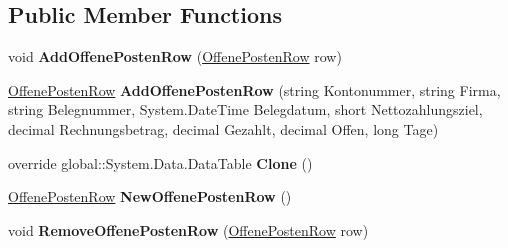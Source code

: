 \subsection*{Public Member Functions}
\begin{DoxyCompactItemize}
\item 
void {\bfseries Add\+Offene\+Posten\+Row} (\hyperlink{class_products_1_1_data_1_1ds_sage_1_1_offene_posten_row}{Offene\+Posten\+Row} row)\hypertarget{class_products_1_1_data_1_1ds_sage_1_1_offene_posten_data_table_a100c2709f5af15d9a6bfcfb93bf4ef4e}{}\label{class_products_1_1_data_1_1ds_sage_1_1_offene_posten_data_table_a100c2709f5af15d9a6bfcfb93bf4ef4e}

\item 
\hyperlink{class_products_1_1_data_1_1ds_sage_1_1_offene_posten_row}{Offene\+Posten\+Row} {\bfseries Add\+Offene\+Posten\+Row} (string Kontonummer, string Firma, string Belegnummer, System.\+Date\+Time Belegdatum, short Nettozahlungsziel, decimal Rechnungsbetrag, decimal Gezahlt, decimal Offen, long Tage)\hypertarget{class_products_1_1_data_1_1ds_sage_1_1_offene_posten_data_table_ae88d92e8fc60869bcdac90d3ee5f1197}{}\label{class_products_1_1_data_1_1ds_sage_1_1_offene_posten_data_table_ae88d92e8fc60869bcdac90d3ee5f1197}

\item 
override global\+::\+System.\+Data.\+Data\+Table {\bfseries Clone} ()\hypertarget{class_products_1_1_data_1_1ds_sage_1_1_offene_posten_data_table_a8fd7f979b596baf705245ee932cfb775}{}\label{class_products_1_1_data_1_1ds_sage_1_1_offene_posten_data_table_a8fd7f979b596baf705245ee932cfb775}

\item 
\hyperlink{class_products_1_1_data_1_1ds_sage_1_1_offene_posten_row}{Offene\+Posten\+Row} {\bfseries New\+Offene\+Posten\+Row} ()\hypertarget{class_products_1_1_data_1_1ds_sage_1_1_offene_posten_data_table_ad062d7e15da2bcba6d9ccd4710266675}{}\label{class_products_1_1_data_1_1ds_sage_1_1_offene_posten_data_table_ad062d7e15da2bcba6d9ccd4710266675}

\item 
void {\bfseries Remove\+Offene\+Posten\+Row} (\hyperlink{class_products_1_1_data_1_1ds_sage_1_1_offene_posten_row}{Offene\+Posten\+Row} row)\hypertarget{class_products_1_1_data_1_1ds_sage_1_1_offene_posten_data_table_a12d6340bcaf6b61f3f288217974923ae}{}\label{class_products_1_1_data_1_1ds_sage_1_1_offene_posten_data_table_a12d6340bcaf6b61f3f288217974923ae}

\end{DoxyCompactItemize}
